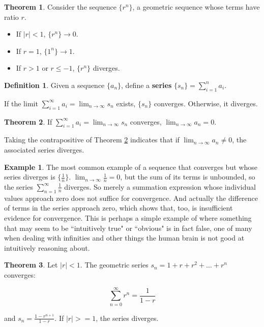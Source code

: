 \documentclass{article}
\theoremstyle{definition}
\newtheorem{definition}{Definition}[section]
\newtheorem{example}{Example}[section]
\newtheorem{theorem}{Theorem}[section]
\begin{document}
\begin{theorem}
Consider the sequence $\{r^n\}$, a geometric sequence whose terms have ratio $r$. 

\begin{itemize}
\item If $|r| < 1$, $\{r^n\} \to 0$.
\item If $r = 1$, $\{1^n\} \to 1$.
\item If $r > 1$ or $r \leq -1$, $\{r^n\}$ diverges.
\end{itemize}

\end{theorem}

\begin{definition}
Given a sequence $\{a_n\}$, define a \textbf{series} $\{s_n\} = \sum\limits_{i=1}^n a_i$.

If the limit $\sum\limits_{i=1}^\infty a_i = \lim_{n \to \infty} s_n$ exists, $\{s_n\}$ converges. Otherwise, it diverges.
\end{definition}

\begin{theorem} \label{convergent-series-sequence}
If $\sum\limits_{i=1}^\infty a_i = \lim_{n \to \infty} s_n$ converges, $\lim_{n \to \infty} a_n = 0$.
\end{theorem}

Taking the contrapositive of Theorem \ref{convergent-series-sequence} indicates that if $\lim_{n \to \infty} a_n \neq 0$, the associated series diverges.

\begin{example} 
The most common example of a sequence that converges but whose series diverges is $\{\frac{1}{n}\}$. $\lim_{n \to \infty} \frac{1}{n} = 0$, but the sum of its terms is unbounded, so the series $\sum\limits_{n=1}^\infty \frac{1}{n}$ diverges. So merely a summation expression whose individual values approach zero does not suffice for convergence. And actually the difference of terms in the series approach zero, which shows that, too, is insufficient evidence for convergence. This is perhaps a simple example of where something that may seem to be ``intuitively true" or ``obvious" is in fact false, one of many when dealing with infinities and other things the human brain is not good at intuitively reasoning about.
\end{example}

\begin{theorem}
Let $|r| < 1$. The geometric series $s_n = 1 + r + r^2 + \ldots + r^n$ converges:

\begin{equation}
\sum\limits_{n=0}^\infty r^n = \frac{1}{1-r}
\end{equation}

and $s_n = \frac{1 - r^{n+1}}{1 - r}$. If $|r| >= 1$, the series diverges.
\end{theorem}
\end{document}
